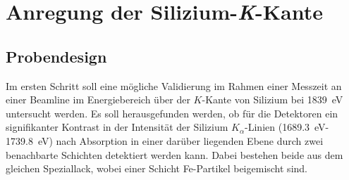 \section{Anregung der Silizium-\textit{K}-Kante}

\subsection{Probendesign}
Im ersten Schritt soll eine mögliche Validierung im Rahmen einer Messzeit an einer Beamline im Energiebereich über der $K$-Kante von Silizium bei \SI{1839}{\electronvolt} untersucht werden. Es soll herausgefunden werden, ob für die Detektoren ein signifikanter Kontrast in der  Intensität der Silizium $K_{\alpha}$-Linien (\SI{1689.3}{\electronvolt}-\SI{1739.8}{\electronvolt}) nach Absorption in einer darüber liegenden Ebene durch zwei benachbarte Schichten detektiert werden kann. Dabei bestehen beide aus dem gleichen Speziallack, wobei einer Schicht Fe-Partikel beigemischt sind.\newline

